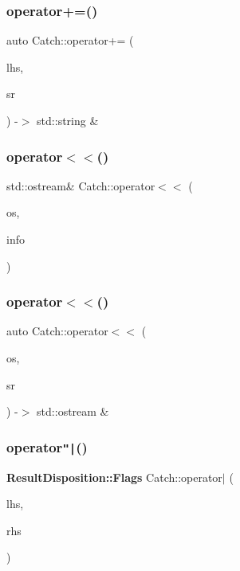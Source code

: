 \subsubsection{operator+=()}
{\footnotesize\ttfamily auto Catch\+::operator+= (\begin{DoxyParamCaption}\item[{std\+::string \&}]{lhs,  }\item[{\textbf{ String\+Ref} const \&}]{sr }\end{DoxyParamCaption}) -\/$>$  std\+::string \&}

\mbox{\label{namespace_catch_a6ec18b5054d7fdfdde861c580b082995}} 
\subsubsection{operator$<$$<$()\hspace{0.1cm}{\footnotesize\ttfamily [1/2]}}
{\footnotesize\ttfamily std\+::ostream\& Catch\+::operator$<$$<$ (\begin{DoxyParamCaption}\item[{std\+::ostream \&}]{os,  }\item[{\textbf{ Source\+Line\+Info} const \&}]{info }\end{DoxyParamCaption})}

\mbox{\label{namespace_catch_a5e37b333d756a28e12d44977f063af43}} 
\subsubsection{operator$<$$<$()\hspace{0.1cm}{\footnotesize\ttfamily [2/2]}}
{\footnotesize\ttfamily auto Catch\+::operator$<$$<$ (\begin{DoxyParamCaption}\item[{std\+::ostream \&}]{os,  }\item[{\textbf{ String\+Ref} const \&}]{sr }\end{DoxyParamCaption}) -\/$>$  std\+::ostream \&}

\mbox{\label{namespace_catch_ab32a083e442cc09f736327d2e2865999}} 
\subsubsection{operator\texttt{"|}()}
{\footnotesize\ttfamily \textbf{ Result\+Disposition\+::\+Flags} Catch\+::operator$\vert$ (\begin{DoxyParamCaption}\item[{\textbf{ Result\+Disposition\+::\+Flags}}]{lhs,  }\item[{\textbf{ Result\+Disposition\+::\+Flags}}]{rhs }\end{DoxyParamCaption})}

